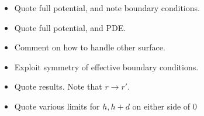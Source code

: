 \begin{itemize}
  \item {Quote full potential, and note boundary conditions.}
  \item Quote full potential, and PDE.
  \item Comment on how to handle other surface.

  \item Exploit symmetry of effective boundary conditions.  
  \item {Quote results.  Note that $r\rightarrow r'$.}

    \item {Quote various limits for $h,h+d$ on either side of 0}


\end{itemize}
